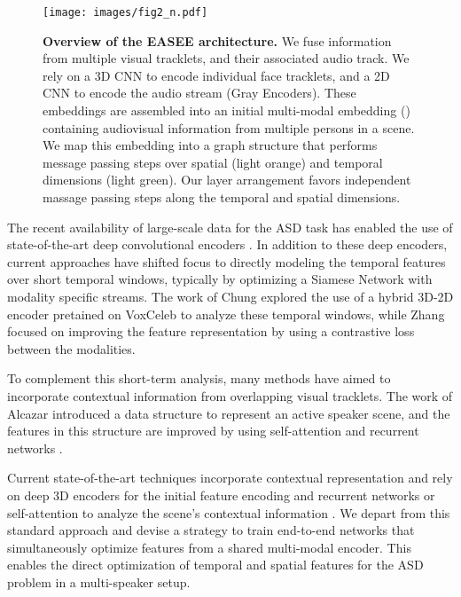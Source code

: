 \documentclass[10pt,twocolumn,letterpaper]{article}
\begin{document}
 \begin{figure*}[t]
    \begin{center}
        \texttt{[image: images/fig2\_n.pdf]}
    \end{center}
    \caption{
        \textbf{Overview of the EASEE architecture.}  We fuse information from multiple visual tracklets, and their associated audio track. We rely on a 3D CNN to encode individual face tracklets, and a 2D CNN to encode the audio stream (Gray Encoders). These embeddings are assembled into an initial multi-modal embedding () containing audiovisual information from multiple persons in a scene. We map this embedding into a graph structure that performs message passing steps over spatial (light orange) and temporal dimensions (light green). Our layer arrangement favors independent massage passing steps along the temporal and spatial dimensions. 
    }
    \label{fig:overview}
\end{figure*} 
The recent availability of large-scale data for the ASD task \cite{roth2020ava} has enabled the use of state-of-the-art deep convolutional encoders \cite{he2016deep,hara2018can}. In addition to these deep encoders, current approaches have shifted focus to directly modeling the temporal features over short temporal windows, typically by optimizing a Siamese Network with modality specific streams. The work of Chung \etal \cite{chung2019naver} explored the use of a hybrid 3D-2D encoder pretained on VoxCeleb \cite{chung2018voxceleb2} to analyze these temporal windows, while Zhang \etal \cite{zhangmulti} focused on improving the feature representation by using a contrastive loss \cite{hadsell2006dimensionality} between the modalities. 

To complement this short-term analysis, many methods \cite{kopuklu2021design,leon2021maas,tao2021someone} have aimed to incorporate contextual information from overlapping visual tracklets. The work of Alcazar \etal \cite{alcazar2020active} introduced a data structure to represent an active speaker scene, and the features in this structure are improved by using self-attention\cite{wang2018non,vaswani2017attention} and recurrent networks \cite{hochreiter1997long}. 

Current state-of-the-art techniques incorporate contextual representation and rely on deep 3D encoders for the initial feature encoding and recurrent networks or self-attention to analyze the scene's contextual information \cite{leon2021maas,kopuklu2021design,tao2021someone,zhang2021unicon}. We depart from this standard approach and devise a strategy to train end-to-end networks that simultaneously optimize features from a shared multi-modal encoder. This enables the direct optimization of temporal and spatial features for the ASD problem in a multi-speaker setup.  
\end{document}
